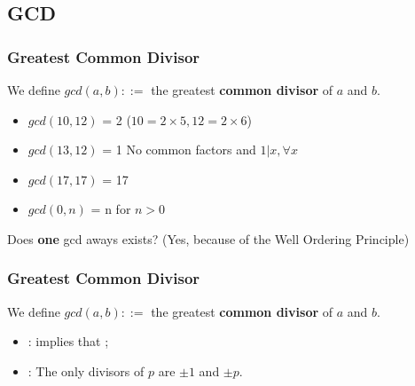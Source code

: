 \documentclass{beamer}
\begin{document}
\subsection{GCD}
\begin{frame}
  \frametitle{Greatest Common Divisor}

  {\larger
    We define $gcd(a,b) ::=$ the greatest {\bf common divisor} of $a$ and $b$.

    \bigskip
    \begin{itemize}
    \item $gcd(10,12)$ = 2 \hfill ($10 = 2\times 5, 12 = 2\times 6$)
    \item $gcd(13,12)$ = 1 \hfill No common factors and $1|x, \forall x$
    \item $gcd(17,17)$ = 17
    \item $gcd(0,n)$ = n \hfill for $n > 0$
    \end{itemize}

    \bigskip

    Does {\bf one} gcd aways exists? (Yes, because of the Well
    Ordering Principle)
  }
\end{frame}

\begin{frame}
  \frametitle{Greatest Common Divisor}

  {\larger

    We define $gcd(a,b) ::=$ the greatest {\bf common divisor} of $a$ and $b$.

    \bigskip

    \begin{itemize}
    \item {\bf {}}:  implies that ;
    \item {\bf {}}: The only divisors of $p$ are $\pm 1$ and $\pm p$.
    \end{itemize}
  }
  
\end{frame}
\end{document}
